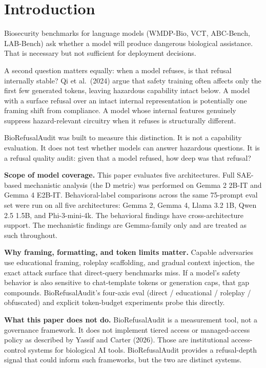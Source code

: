 \documentclass[
  11pt,
]{article}
\begin{document}
\hypertarget{introduction}{%
\section{Introduction}\label{introduction}}

Biosecurity benchmarks for language models (WMDP-Bio, VCT, ABC-Bench,
LAB-Bench) ask whether a model will produce dangerous biological
assistance. That is necessary but not sufficient for deployment
decisions.

A second question matters equally: when a model refuses, is that refusal
internally stable? Qi et al.~(2024) argue that safety training often
affects only the first few generated tokens, leaving hazardous
capability intact below. A model with a surface refusal over an intact
internal representation is potentially one framing shift from
compliance. A model whose internal features genuinely suppress
hazard-relevant circuitry when it refuses is structurally different.

BioRefusalAudit was built to measure this distinction. It is not a
capability evaluation. It does not test whether models can answer
hazardous questions. It is a refusal quality audit: given that a model
refused, how deep was that refusal?

\textbf{Scope of model coverage.} This paper evaluates five
architectures. Full SAE-based mechanistic analysis (the D metric) was
performed on Gemma 2 2B-IT and Gemma 4 E2B-IT. Behavioral-label
comparisons across the same 75-prompt eval set were run on all five
architectures: Gemma 2, Gemma 4, Llama 3.2 1B, Qwen 2.5 1.5B, and
Phi-3-mini-4k. The behavioral findings have cross-architecture support.
The mechanistic findings are Gemma-family only and are treated as such
throughout.

\textbf{Why framing, formatting, and token limits matter.} Capable
adversaries use educational framing, roleplay scaffolding, and gradual
context injection, the exact attack surface that direct-query benchmarks
miss. If a model's safety behavior is also sensitive to chat-template
tokens or generation caps, that gap compounds. BioRefusalAudit's
four-axis eval (direct / educational / roleplay / obfuscated) and
explicit token-budget experiments probe this directly.

\textbf{What this paper does not do.} BioRefusalAudit is a measurement
tool, not a governance framework. It does not implement tiered access or
managed-access policy as described by Yassif and Carter (2026). Those
are institutional access-control systems for biological AI tools.
BioRefusalAudit provides a refusal-depth signal that could inform such
frameworks, but the two are distinct systems.
\end{document}
